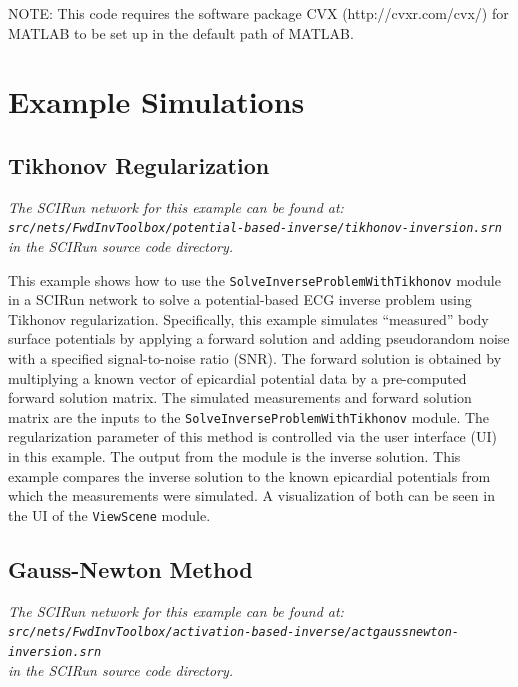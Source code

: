 NOTE: This code requires the software package CVX (http://cvxr.com/cvx/) for MATLAB to be set up in the default path of MATLAB.

\section{Example Simulations}

\subsection{Tikhonov Regularization}

\vspace{5pt}\textit{The SCIRun network for this example can be found at:\\{\tt src/nets/FwdInvToolbox/potential-based-inverse/tikhonov-inversion.srn}\\in the SCIRun source code directory.}\vspace{5pt}


This example shows how to use the {\tt SolveInverseProblemWithTikhonov} module in a SCIRun network to solve a potential-based ECG inverse problem using Tikhonov regularization. Specifically, this example simulates ``measured'' body surface potentials by applying a forward solution and adding pseudorandom noise with a specified signal-to-noise ratio (SNR). The forward solution is obtained by multiplying a known vector of epicardial potential data by a pre-computed forward solution matrix. The simulated measurements and forward solution matrix are the inputs to the {\tt SolveInverseProblemWithTikhonov} module. The regularization parameter of this method is controlled via the user interface (UI) in this example. The output from the module is the inverse solution. This example compares the inverse solution to the known epicardial potentials from which the measurements were simulated. A visualization of both can be seen in the UI of the {\tt ViewScene} module.

\subsection{Gauss-Newton Method}

\vspace{5pt}\textit{The SCIRun network for this example can be found at:\\{\tt src/nets/FwdInvToolbox/activation-based-inverse/actgaussnewton-inversion.srn}\\in the SCIRun source code directory.}\vspace{5pt}

